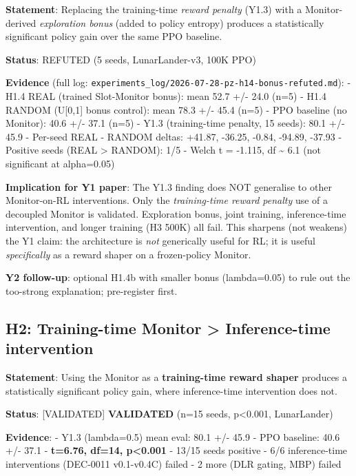 \documentclass[
]{article}
\begin{document}
\textbf{Statement}: Replacing the training-time \emph{reward penalty}
(Y1.3) with a Monitor-derived \emph{exploration bonus} (added to policy
entropy) produces a statistically significant policy gain over the same
PPO baseline.

\textbf{Status}: REFUTED (5 seeds, LunarLander-v3, 100K PPO)

\textbf{Evidence} (full log:
\texttt{experiments\_log/2026-07-28-pz-h14-bonus-refuted.md}): - H1.4
REAL (trained Slot-Monitor bonus): mean 52.7 +/- 24.0 (n=5) - H1.4
RANDOM (U{[}0,1{]} bonus control): mean 78.3 +/- 45.4 (n=5) - PPO
baseline (no Monitor): 40.6 +/- 37.1 (n=5) - Y1.3 (training-time
penalty, 15 seeds): 80.1 +/- 45.9 - Per-seed REAL - RANDOM deltas:
+41.87, -36.25, -0.84, -94.89, -37.93 - Positive seeds (REAL
\textgreater{} RANDOM): 1/5 - Welch t = -1.115, df \textasciitilde{} 6.1
(not significant at alpha=0.05)

\textbf{Implication for Y1 paper}: The Y1.3 finding does NOT generalise
to other Monitor-on-RL interventions. Only the \emph{training-time
reward penalty} use of a decoupled Monitor is validated. Exploration
bonus, joint training, inference-time intervention, and longer training
(H3 500K) all fail. This sharpens (not weakens) the Y1 claim: the
architecture is \emph{not} generically useful for RL; it is useful
\emph{specifically} as a reward shaper on a frozen-policy Monitor.

\textbf{Y2 follow-up}: optional H1.4b with smaller bonus (lambda=0.05)
to rule out the too-strong explanation; pre-register first.

\subsection{H2: Training-time Monitor \textgreater{} Inference-time
intervention}\label{h2-training-time-monitor-inference-time-intervention}

\textbf{Statement}: Using the Monitor as a \textbf{training-time reward
shaper} produces a statistically significant policy gain, where
inference-time intervention does not.

\textbf{Status}: {[}VALIDATED{]} \textbf{VALIDATED} (n=15 seeds,
p\textless0.001, LunarLander)

\textbf{Evidence}: - Y1.3 (lambda=0.5) mean eval: 80.1 +/- 45.9 - PPO
baseline: 40.6 +/- 37.1 - \textbf{t=6.76, df=14, p\textless0.001} -
13/15 seeds positive - 6/6 inference-time interventions (DEC-0011
v0.1-v0.4C) failed - 2 more (DLR gating, MBP) failed
\end{document}
